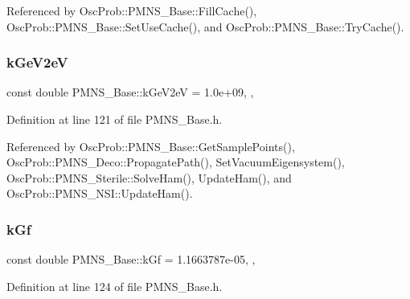 Referenced by Osc\+Prob\+::\+P\+M\+N\+S\+\_\+\+Base\+::\+Fill\+Cache(), Osc\+Prob\+::\+P\+M\+N\+S\+\_\+\+Base\+::\+Set\+Use\+Cache(), and Osc\+Prob\+::\+P\+M\+N\+S\+\_\+\+Base\+::\+Try\+Cache().

\mbox{\label{classOscProb_1_1PMNS__Base_ad36a0a6bf58d6ec093d3947784bd89e9}} 
\subsubsection{\texorpdfstring{k\+Ge\+V2eV}{kGeV2eV}}
{\footnotesize\ttfamily const double P\+M\+N\+S\+\_\+\+Base\+::k\+Ge\+V2eV = 1.\+0e+09\hspace{0.3cm}{\ttfamily [static]}, {\ttfamily [protected]}, {\ttfamily [inherited]}}



Definition at line 121 of file P\+M\+N\+S\+\_\+\+Base.\+h.



Referenced by Osc\+Prob\+::\+P\+M\+N\+S\+\_\+\+Base\+::\+Get\+Sample\+Points(), Osc\+Prob\+::\+P\+M\+N\+S\+\_\+\+Deco\+::\+Propagate\+Path(), Set\+Vacuum\+Eigensystem(), Osc\+Prob\+::\+P\+M\+N\+S\+\_\+\+Sterile\+::\+Solve\+Ham(), Update\+Ham(), and Osc\+Prob\+::\+P\+M\+N\+S\+\_\+\+N\+S\+I\+::\+Update\+Ham().

\mbox{\label{classOscProb_1_1PMNS__Base_a7f26a3456128234b2ae6cc9141a6532f}} 
\subsubsection{\texorpdfstring{k\+Gf}{kGf}}
{\footnotesize\ttfamily const double P\+M\+N\+S\+\_\+\+Base\+::k\+Gf = 1.\+1663787e-\/05\hspace{0.3cm}{\ttfamily [static]}, {\ttfamily [protected]}, {\ttfamily [inherited]}}



Definition at line 124 of file P\+M\+N\+S\+\_\+\+Base.\+h.




